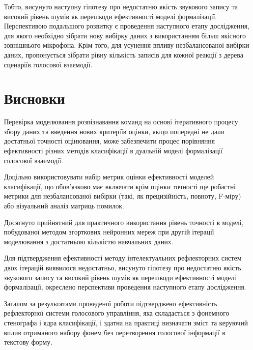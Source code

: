 Тобто, висунуто наступну гіпотезу про недостатню якість звукового запису та високий рівень шумів як перешкоди ефективності моделі формалізації. Перспективою подальшого розвитку є проведення наступного етапу дослідження, для якого необхідно зібрати нову вибірку даних з використанням більш якісного зовнішнього мікрофона. Крім того, для усунення впливу незбалансованої вибірки даних, пропонується зібрати рівну кількість записів для кожної реакції з дерева сценаріїв голосової взаємодії.

\section{Висновки}

Перевірка моделювання розпізнавання команд на основі ітеративного процесу збору даних та введення нових критеріїв оцінки, якщо попередні не дали достатньої точності оцінювання, може забезпечити процес порівняння ефективності різних методів класифікації в дуальній моделі формалізації голосової взаємодії.

Доцільно використовувати набір метрик оцінки ефективності моделей класифікації, що обов’язково має включати крім оцінки точності ще робастні метрики для незбалансованої вибірки (такі, як прецизійність, повноту, F-міру) або візуальний аналіз матриць помилок. 

Досягнуто прийнятний для практичного використання рівень точності в моделі, побудованої методом згорткових нейронних мереж при другій ітерації моделювання з достатньою кількістю навчальних даних.

Для підтвердження ефективності методу інтелектуальних рефлекторних систем двох ітерацій виявилося недостатньо, висунуто гіпотезу про недостатню якість звукового запису та високий рівень шумів як перешкоди ефективності моделі формалізації, окреслено перспективи проведення наступного етапу дослідження.

Загалом за результатами проведеної роботи підтверджено ефективність рефлекторної системи голосового управління, яка складається з фонемного стенографа і ядра класифікації, і здатна на практиці  визначати зміст та керуючий вплив отриманого набору фонем без перетворення голосової інформації в текстову форму. 


